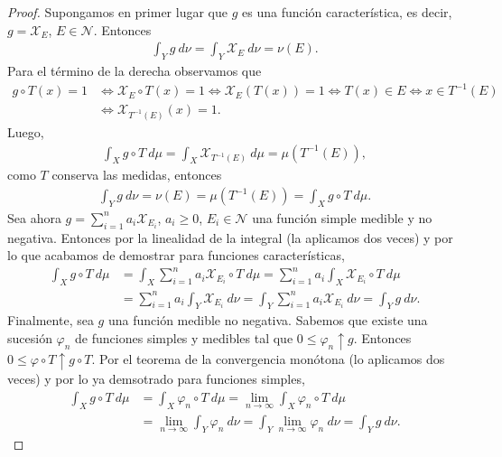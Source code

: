 \begin{proof}
Supongamos en primer lugar que $g$ es una función característica, es decir, $g = \mathcal{X}_E$, $E \in \mathcal{N}$. Entonces
\begin{align*}
    \int_{Y}{g \ d\nu} = \int_{Y}{\mathcal{X}_E \ d\nu} = \nu(E).
\end{align*}
Para el término de la derecha observamos que
\begin{align*}
    g \circ T(x) = 1 &\Leftrightarrow \mathcal{X}_E \circ T(x) = 1 \Leftrightarrow \mathcal{X}_E(T(x)) = 1 \Leftrightarrow T(x) \in E \Leftrightarrow x \in T^{-1}(E)\\
    &\Leftrightarrow \mathcal{X}_{T^{-1}(E)}(x) = 1.
\end{align*}
Luego,
\begin{align*}
    \int_{X}{g \circ T \ d\mu} = \int_{X}{\mathcal{X}_{T^{-1}(E)} \ d\mu} = \mu(T^{-1}(E)),
\end{align*}
como $T$ conserva las medidas, entonces
\begin{align*}
    \int_{Y}{g \ d\nu}  = \nu(E) = \mu(T^{-1}(E)) = \int_{X}{g \circ T \ d\mu}.
\end{align*}
Sea ahora $g = \sum_{i=1}^{n}{a_i\mathcal{X}_{E_i}}$, $a_i \ge 0$, $E_i \in \mathcal{N}$ una función simple medible y no negativa. Entonces por la linealidad de la integral (la aplicamos dos veces) y por lo que acabamos de demostrar para funciones características,
\begin{align*}
    \int_{X}{g \circ T \ d\mu} &= \int_{X}{\sum_{i=1}^{n}{a_i\mathcal{X}_{E_i}} \circ T \ d\mu} = \sum_{i=1}^{n}{a_i \int_{X}{\mathcal{X}_{E_i} \circ T \ d\mu}}\\
    &= \sum_{i=1}^{n}{a_i \int_{Y}{\mathcal{X}_{E_i}} \ d\nu} = \int_{Y}{\sum_{i=1}^{n}{a_i\mathcal{X}_{E_i}} \ d\nu} = \int_{Y}{g \ d\nu}.
\end{align*}
Finalmente, sea $g$ una función medible no negativa. Sabemos que existe una sucesión $\varphi_n$ de funciones simples y medibles tal que $0 \leq \varphi_n \uparrow g$. Entonces $0 \leq \varphi \circ T \uparrow g \circ T$. Por el teorema de la convergencia monótona (lo aplicamos dos veces) y por lo ya demsotrado para funciones simples,
\begin{align*}
    \int_{X}{g \circ T \ d\mu} &= \int_{X}{\varphi_n \circ T \ d\mu} = \lim_{n \to \infty}{\int_{X}{\varphi_n \circ T} \ d\mu}\\
    &= \lim_{n \to \infty}{\int_{Y}{\varphi_n} \ d\nu} = \int_{Y}{\lim_{n \to \infty}{\varphi_n} \ d\nu} = \int_{Y}{g \ d\nu}.
\end{align*}
\end{proof}

